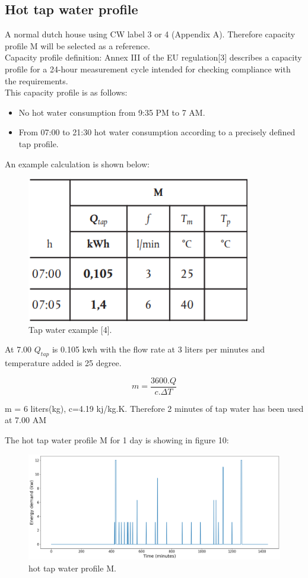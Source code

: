 \documentclass[a4paper,10pt]{article}
\begin{document}
\subsection{Hot tap water profile}
 
 
A normal dutch house using CW label 3 or 4 (Appendix A). Therefore capacity profile M will be selected as a reference.\\
Capacity profile definition:
Annex III of the EU regulation[3] describes a capacity profile for a 24-hour measurement cycle intended for checking compliance with the requirements.\\
This capacity profile is as follows:

\begin{itemize}
      \item No hot water consumption from 9:35 PM to 7 AM.
      \item From 07:00 to 21:30 hot water consumption according to a precisely defined tap profile.
    \end{itemize}
An example calculation is shown below: 

\begin{figure}[H]
\centering
\includegraphics[width=0.6\columnwidth]{pictures/Tap_water example.png}
\caption[Short title]{Tap water example [4].}
\label{fig:ff7}\end{figure}
At 7.00 $Q_{tap}$ is 0.105 kwh with the flow rate at 3 liters  per minutes and temperature added is 25 degree.

\[m = \frac{3600.Q}{c.\Delta T}\]

m = 6 liters(kg), c=4.19 kj/kg.K. Therefore 2 minutes of tap water has been used at 7.00 AM

The hot tap water profile M for 1 day is showing in figure 10:

\begin{figure}[H]
\centering
\includegraphics[width=1\columnwidth]{pictures/hot_tap_water_profile_M.png}
\caption[Short title]{hot tap water profile M.}
\label{fig:ff8}\end{figure}
\end{document}
